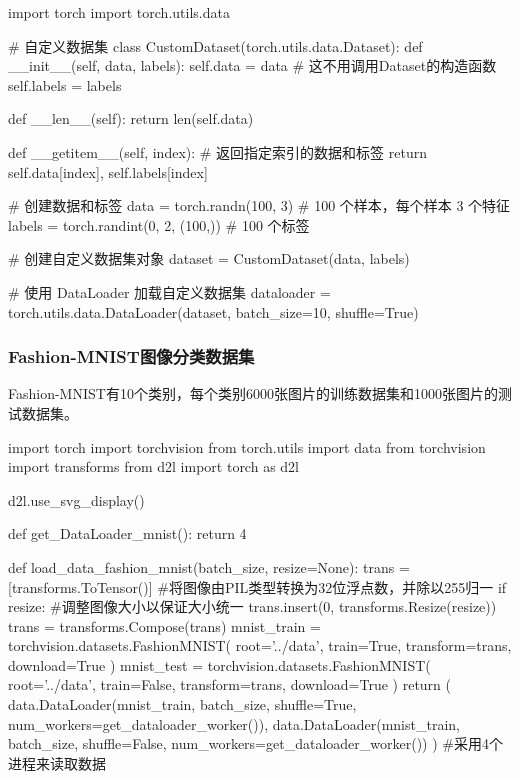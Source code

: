       \begin{codeblock}[language=python, caption={Customize DataLoader}]
        import torch
        import torch.utils.data

        # 自定义数据集
        class CustomDataset(torch.utils.data.Dataset):
            def __init__(self, data, labels):
                self.data = data # 这不用调用Dataset的构造函数
                self.labels = labels

            def __len__(self):
                return len(self.data)

            def __getitem__(self, index):
                # 返回指定索引的数据和标签
                return self.data[index], self.labels[index]

        # 创建数据和标签
        data = torch.randn(100, 3)  # 100 个样本，每个样本 3 个特征
        labels = torch.randint(0, 2, (100,))  # 100 个标签

        # 创建自定义数据集对象
        dataset = CustomDataset(data, labels)

        # 使用 DataLoader 加载自定义数据集
        dataloader = torch.utils.data.DataLoader(dataset, batch_size=10, shuffle=True)
      \end{codeblock}

    \subsubsection{Fashion-MNIST图像分类数据集}
      Fashion-MNIST有10个类别，每个类别6000张图片的训练数据集和1000张图片的测试数据集。
      \begin{codeblock}[language = python, caption={Download Fashion-MNIST}]
        import torch
        import torchvision
        from torch.utils import data
        from torchvision import transforms
        from d2l import torch as d2l

        d2l.use_svg_display()

        def get_DataLoader_mnist():
            return 4

        def load_data_fashion_mnist(batch_size, resize=None):
            trans = [transforms.ToTensor()] #将图像由PIL类型转换为32位浮点数，并除以255归一
            if resize: #调整图像大小以保证大小统一
                trans.insert(0, transforms.Resize(resize))
            trans = transforms.Compose(trans)
            mnist_train = torchvision.datasets.FashionMNIST(
                root='../data', train=True, transform=trans, download=True
            )
            mnist_test = torchvision.datasets.FashionMNIST(
                root='../data', train=False, transform=trans, download=True
            )
            return (
                data.DataLoader(mnist_train, batch_size, shuffle=True, 
                                num_workers=get_dataloader_worker()),
                data.DataLoader(mnist_train, batch_size, shuffle=False, 
                                num_workers=get_dataloader_worker())
            ) #采用4个进程来读取数据
      \end{codeblock}
